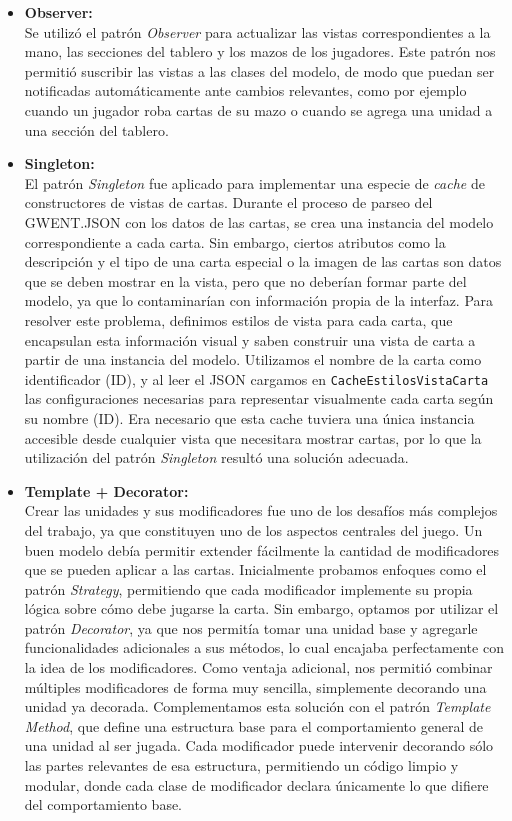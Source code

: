 \documentclass[titlepage,a4paper]{article}
\begin{document}
	\begin{itemize}
		\item \textbf{Observer:} \\
		Se utilizó el patrón \textit{Observer} para actualizar las vistas correspondientes a la mano, las secciones del tablero y los mazos de los jugadores. Este patrón nos permitió suscribir las vistas a las clases del modelo, de modo que puedan ser notificadas automáticamente ante cambios relevantes, como por ejemplo cuando un jugador roba cartas de su mazo o cuando se agrega una unidad a una sección del tablero.

		\item \textbf{Singleton:} \\
		El patrón \textit{Singleton} fue aplicado para implementar una especie de \textit{cache} de constructores de vistas de cartas. Durante el proceso de parseo del GWENT.JSON con los datos de las cartas, se crea una instancia del modelo correspondiente a cada carta. Sin embargo, ciertos atributos como la descripción y el tipo de una carta especial o la imagen de las cartas son datos que se deben mostrar en la vista, pero que no deberían formar parte del modelo, ya que lo contaminarían con información propia de la interfaz.
		Para resolver este problema, definimos estilos de vista para cada carta, que encapsulan esta información visual y saben construir una vista de carta a partir de una instancia del modelo. Utilizamos el nombre de la carta como identificador (ID), y al leer el JSON cargamos en \texttt{CacheEstilosVistaCarta} las configuraciones necesarias para representar visualmente cada carta según su nombre (ID).
		Era necesario que esta cache tuviera una única instancia accesible desde cualquier vista que necesitara mostrar cartas, por lo que la utilización del patrón \textit{Singleton} resultó una solución adecuada.

		\item \textbf{Template + Decorator:} \\
		Crear las unidades y sus modificadores fue uno de los desafíos más complejos del trabajo, ya que constituyen uno de los aspectos centrales del juego. Un buen modelo debía permitir extender fácilmente la cantidad de modificadores que se pueden aplicar a las cartas.
		Inicialmente probamos enfoques como el patrón \textit{Strategy}, permitiendo que cada modificador implemente su propia lógica sobre cómo debe jugarse la carta. Sin embargo, optamos por utilizar el patrón \textit{Decorator}, ya que nos permitía tomar una unidad base y agregarle funcionalidades adicionales a sus métodos, lo cual encajaba perfectamente con la idea de los modificadores. Como ventaja adicional, nos permitió combinar múltiples modificadores de forma muy sencilla, simplemente decorando una unidad ya decorada.
		Complementamos esta solución con el patrón \textit{Template Method}, que define una estructura base para el comportamiento general de una unidad al ser jugada. Cada modificador puede intervenir decorando sólo las partes relevantes de esa estructura, permitiendo un código limpio y modular, donde cada clase de modificador declara únicamente lo que difiere del comportamiento base.



\end{itemize}
\end{document}
